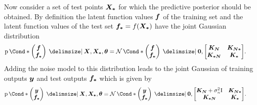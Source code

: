 Now consider a set of test points $\bm{X_\ast}$ for which the predictive posterior should be obtained.
By definition the latent function values $\bm{f}$ of the training set and the latent function values of the test set $\bm{f_\ast} = f(\bm{X_\ast})$ have the joint Gaussian distribution
\begin{align}
    \Prob*{\begin{pmatrix}
        \mat{f} \\
        \mat{f_\ast}
    \end{pmatrix} \given \mat{X}, \mat{X_\ast}, \mat{\theta}} &= \Gaussian*{\begin{pmatrix}
        \mat{f} \\
        \mat{f_\ast}
    \end{pmatrix} \given \mat{0}, \begin{bmatrix}
        \mat{K_N} & \mat{K_{N\ast}} \\
        \mat{K_{\ast N}} & \mat{K_{\ast}}
    \end{bmatrix}}.
\end{align}
Adding the noise model to this distribution leads to the joint Gaussian of training outputs $\bm{y}$ and test outputs $\bm{f_\ast}$ which is given by
\begin{align}
    \Prob*{\begin{pmatrix}
        \mat{y} \\
        \mat{f_\ast}
    \end{pmatrix} \given \mat{X}, \mat{X_\ast}, \mat{\theta}} &= \Gaussian*{\begin{pmatrix}
        \mat{y} \\
        \mat{f_\ast}
    \end{pmatrix} \given \mat{0}, \begin{bmatrix}
        \mat{K_N} + \sigma_n^2 \Eye & \mat{K_{N\ast}} \\
        \mat{K_{\ast N}} & \mat{K_{\ast}}
    \end{bmatrix}}.
\end{align}

